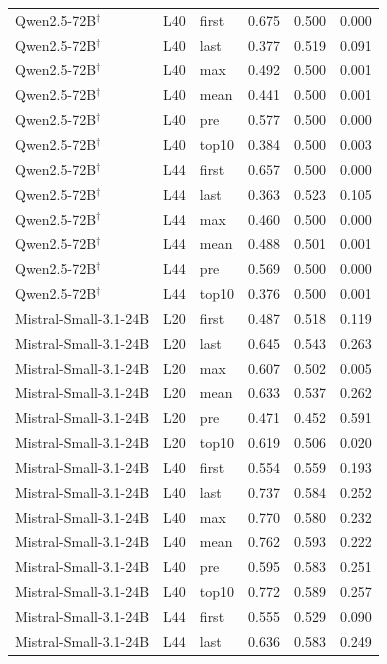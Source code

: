 \begin{table}
\begin{tabular}{lllrrr}
Qwen2.5-72B$^\dagger$ & L40 & first & 0.675 & 0.500 & 0.000 \\
Qwen2.5-72B$^\dagger$ & L40 & last & 0.377 & 0.519 & 0.091 \\
Qwen2.5-72B$^\dagger$ & L40 & max & 0.492 & 0.500 & 0.001 \\
Qwen2.5-72B$^\dagger$ & L40 & mean & 0.441 & 0.500 & 0.001 \\
Qwen2.5-72B$^\dagger$ & L40 & pre & 0.577 & 0.500 & 0.000 \\
Qwen2.5-72B$^\dagger$ & L40 & top10 & 0.384 & 0.500 & 0.003 \\
Qwen2.5-72B$^\dagger$ & L44 & first & 0.657 & 0.500 & 0.000 \\
Qwen2.5-72B$^\dagger$ & L44 & last & 0.363 & 0.523 & 0.105 \\
Qwen2.5-72B$^\dagger$ & L44 & max & 0.460 & 0.500 & 0.000 \\
Qwen2.5-72B$^\dagger$ & L44 & mean & 0.488 & 0.501 & 0.001 \\
Qwen2.5-72B$^\dagger$ & L44 & pre & 0.569 & 0.500 & 0.000 \\
Qwen2.5-72B$^\dagger$ & L44 & top10 & 0.376 & 0.500 & 0.001 \\
Mistral-Small-3.1-24B & L20 & first & 0.487 & 0.518 & 0.119 \\
Mistral-Small-3.1-24B & L20 & last & 0.645 & 0.543 & 0.263 \\
Mistral-Small-3.1-24B & L20 & max & 0.607 & 0.502 & 0.005 \\
Mistral-Small-3.1-24B & L20 & mean & 0.633 & 0.537 & 0.262 \\
Mistral-Small-3.1-24B & L20 & pre & 0.471 & 0.452 & 0.591 \\
Mistral-Small-3.1-24B & L20 & top10 & 0.619 & 0.506 & 0.020 \\
Mistral-Small-3.1-24B & L40 & first & 0.554 & 0.559 & 0.193 \\
Mistral-Small-3.1-24B & L40 & last & 0.737 & 0.584 & 0.252 \\
Mistral-Small-3.1-24B & L40 & max & 0.770 & 0.580 & 0.232 \\
Mistral-Small-3.1-24B & L40 & mean & 0.762 & 0.593 & 0.222 \\
Mistral-Small-3.1-24B & L40 & pre & 0.595 & 0.583 & 0.251 \\
Mistral-Small-3.1-24B & L40 & top10 & 0.772 & 0.589 & 0.257 \\
Mistral-Small-3.1-24B & L44 & first & 0.555 & 0.529 & 0.090 \\
Mistral-Small-3.1-24B & L44 & last & 0.636 & 0.583 & 0.249 \\

\end{tabular}
\end{table}
